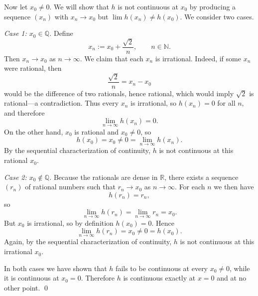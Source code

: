 \documentclass[12pt]{article}
\begin{document}
Now let $x_0\neq 0$.  We will show that $h$ is not continuous at $x_0$ by
producing a sequence $(x_n)$ with $x_n\to x_0$ but $\lim h(x_n)\neq h(x_0)$.
We consider two cases.

\emph{Case 1: $x_0\in\mathbb{Q}$.}  Define
\[
  x_n := x_0 + \frac{\sqrt{2}}{n}, \qquad n\in\mathbb{N}.
\]
Then $x_n\to x_0$ as $n\to\infty$.  We claim that each $x_n$ is irrational.
Indeed, if some $x_n$ were rational, then
\[
  \frac{\sqrt{2}}{n} = x_n - x_0
\]
would be the difference of two rationals, hence rational, which would imply
$\sqrt{2}$ is rational---a contradiction.  Thus every $x_n$ is irrational,
so $h(x_n)=0$ for all $n$, and therefore
\[
  \lim_{n\to\infty} h(x_n) = 0.
\]
On the other hand, $x_0$ is rational and $x_0\neq 0$, so
\[
  h(x_0) = x_0 \neq 0 = \lim_{n\to\infty} h(x_n).
\]
By the sequential characterization of continuity, $h$ is not continuous at
this rational $x_0$.

\emph{Case 2: $x_0\notin\mathbb{Q}$.}  Because the rationals are dense in
$\mathbb{R}$, there exists a sequence $(r_n)$ of rational numbers such that
$r_n\to x_0$ as $n\to\infty$.  For each $n$ we then have
\[
  h(r_n) = r_n,
\]
so
\[
  \lim_{n\to\infty} h(r_n) = \lim_{n\to\infty} r_n = x_0.
\]
But $x_0$ is irrational, so by definition $h(x_0)=0$.  Hence
\[
  \lim_{n\to\infty} h(r_n) = x_0 \neq 0 = h(x_0).
\]
Again, by the sequential characterization of continuity, $h$ is not
continuous at this irrational $x_0$.

In both cases we have shown that $h$ fails to be continuous at every
$x_0\neq 0$, while it is continuous at $x_0=0$.  Therefore $h$ is continuous
exactly at $x=0$ and at no other point. \qed
\end{document}
